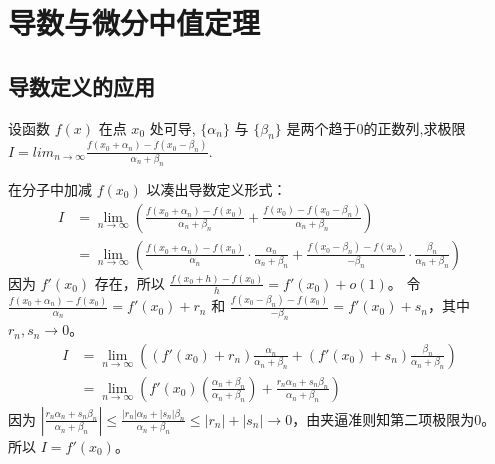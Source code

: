 \documentclass[lang=cn,newtx,10pt,scheme=chinese]{elegantbook}
\begin{document}
\section{导数与微分中值定理}
\subsection{导数定义的应用}
\begin{problem}[CMC真题]
 设函数 $f(x)$ 在点 $x_{0}$ 处可导, $\{\alpha_{n}\}$ 与 $\{\beta_{n}\}$ 是两个趋于0的正数列,求极限
$I=lim_{n\rightarrow\infty}\frac{f(x_{0}+\alpha_{n})-f(x_{0}-\beta_{n})}{\alpha_{n}+\beta_{n}}.$
\end{problem}
\begin{solution}
    在分子中加减 $f(x_0)$ 以凑出导数定义形式：
    \begin{align*}
        I &= \lim_{n\to\infty} \left( \frac{f(x_0+\alpha_n) - f(x_0)}{\alpha_n+\beta_n} + \frac{f(x_0) - f(x_0-\beta_n)}{\alpha_n+\beta_n} \right) \\
        &= \lim_{n\to\infty} \left( \frac{f(x_0+\alpha_n) - f(x_0)}{\alpha_n} \cdot \frac{\alpha_n}{\alpha_n+\beta_n} + \frac{f(x_0-\beta_n) - f(x_0)}{-\beta_n} \cdot \frac{\beta_n}{\alpha_n+\beta_n} \right)
    \end{align*}
    因为 $f'(x_0)$ 存在，所以 $\frac{f(x_0+h)-f(x_0)}{h} = f'(x_0) + o(1)$。
    令 $\frac{f(x_0+\alpha_n) - f(x_0)}{\alpha_n} = f'(x_0) + r_n$ 和 $\frac{f(x_0-\beta_n) - f(x_0)}{-\beta_n} = f'(x_0) + s_n$，其中 $r_n, s_n \to 0$。
    \begin{align*}
        I &= \lim_{n\to\infty} \left( (f'(x_0)+r_n)\frac{\alpha_n}{\alpha_n+\beta_n} + (f'(x_0)+s_n)\frac{\beta_n}{\alpha_n+\beta_n} \right) \\
        &= \lim_{n\to\infty} \left( f'(x_0)(\frac{\alpha_n+\beta_n}{\alpha_n+\beta_n}) + \frac{r_n\alpha_n+s_n\beta_n}{\alpha_n+\beta_n} \right)
    \end{align*}
    因为 $|\frac{r_n\alpha_n+s_n\beta_n}{\alpha_n+\beta_n}| \le \frac{|r_n|\alpha_n+|s_n|\beta_n}{\alpha_n+\beta_n} \le |r_n|+|s_n| \to 0$，由夹逼准则知第二项极限为0。
    所以 $I = f'(x_0)$。
\end{solution}
\end{document}
